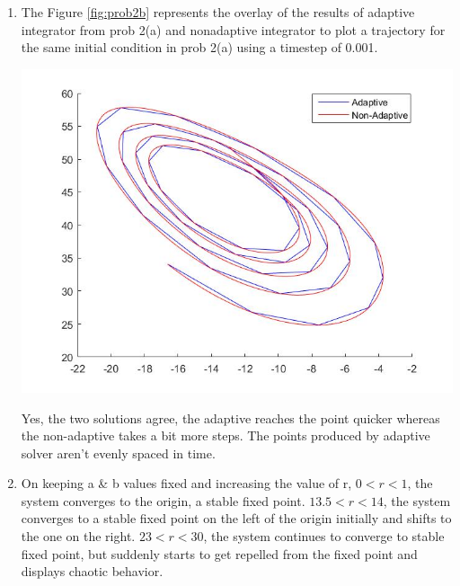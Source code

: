 \documentclass{article}
\begin{document}
\begin{enumerate}[label=(\alph*)]
\item
The Figure \ref{fig:prob2b} represents the overlay of the results of adaptive integrator from prob 2(a) and nonadaptive integrator to plot a trajectory for the same initial condition in prob 2(a) using a timestep of 0.001.
\begin{minipage}{\linewidth}
{
\centering 
\includegraphics[scale=0.4]{images/prob2b.jpg}
\label{fig:prob2b}
}
\par\medskip
Yes, the two solutions agree, the adaptive reaches the point quicker whereas the non-adaptive takes a bit more steps. The points produced by adaptive solver aren't evenly spaced in time.
\end{minipage}
\newpage
\item
On keeping a \& b values fixed and increasing the value of r,
\textbf{$0 < r < 1$}, the system converges to the origin, a stable fixed point.
\textbf{$13.5 < r < 14$}, the system converges to a stable fixed point on the left of the origin initially and shifts to the one on the right.
\textbf{$23 < r < 30$}, the system continues to converge to stable fixed point, but suddenly starts to get repelled from the fixed point and displays chaotic behavior.

\end{enumerate}
\end{document}
